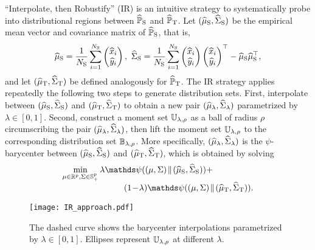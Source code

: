 \documentclass{article}
\begin{document}
``Interpolate, then Robustify'' (IR) is an intuitive strategy to systematically probe into distributional regions between $\widehat{\mathbb P}_{\rm S}$ and $\widehat{\mathbb P}_{\rm T}$. Let $(\widehat {\mu}_{\rm S}, \widehat{\Sigma}_{\rm S})$ be the empirical mean vector and covariance matrix of $\widehat{\mathbb P}_{\rm S}$, that is,
\[
    \widehat {\mu}_{\rm S} = \frac{1}{N_{\rm S}} \sum_{i=1}^{N_{\rm S}} \begin{pmatrix}
    \widehat x_i \\ \widehat y_i
    \end{pmatrix},~\widehat{\Sigma}_{\rm S} =\frac{1}{N_{\rm S}} \sum_{i=1}^{N_{\rm S}} \begin{pmatrix}
    \widehat x_i \\ \widehat y_i
    \end{pmatrix}\begin{pmatrix}
    \widehat x_i \\ \widehat y_i
    \end{pmatrix}^\top - \widehat {\mu}_{\rm S} \widehat {\mu}_{\rm S}^\top,
\]
and let $(\widehat {\mu}_{\rm T}, \widehat{\Sigma}_{\rm T})$ be defined analogously for $\widehat{\mathbb P}_{\rm T}$. The IR strategy applies repeatedly the following two steps to generate distribution sets. First, interpolate between $(\widehat {\mu}_{\rm S}, \widehat{\Sigma}_{\rm S})$ and $(\widehat {\mu}_{\rm T}, \widehat{\Sigma}_{\rm T})$ to obtain a new pair $(\widehat {\mu}_\lambda, \widehat{\Sigma}_\lambda)$ parametrized by $\lambda \in [0, 1]$. Second, construct a moment set $\mathbb U_{\lambda, \rho}$ as a ball of radius $\rho$ circumscribing the pair $(\widehat {\mu}_\lambda, \widehat{\Sigma}_\lambda)$, then lift the moment set $\mathbb U_{\lambda, \rho}$ to the corresponding distribution set $\mathbb B_{\lambda, \rho}$. More specifically, $(\widehat {\mu}_\lambda, \widehat{\Sigma}_\lambda)$ is the $\psi$-barycenter between $(\widehat {\mu}_{\rm S}, \widehat{\Sigma}_{\rm S})$ and $(\widehat {\mu}_{\rm T}, \widehat{\Sigma}_{\rm T})$, which is obtained by solving
\begin{equation}
\begin{array}{c@{\,}lll}
        \min\limits_{\mu \in \R^p, \Sigma \in \mbb{S}^p_+}& \lambda \mathds \psi((\m, \cov)\! \parallel\! (\msa_{\rm S}, \covsa_{\rm S})) + \\
        &\hspace{1cm} (1\! -\! \lambda) \mathds \psi( (\m, \cov) \! \parallel \! (\msa_{\rm T}, \covsa_{\rm T})).
\end{array}
\label{eq:mean_cov_interpolation}
\end{equation}
\begin{figure}[ht!]
    \centering
    \vspace{-2mm}
    \texttt{[image: IR\_approach.pdf]} 
    \vspace{-8mm}
    \caption{The dashed curve shows the barycenter interpolations parametrized by $\lambda\in[0,1]$. Ellipses represent $\mathbb U_{\lambda, \rho}$ at different $\lambda$.}
    \label{fig:ir_strategy}
\end{figure}
\end{document}

